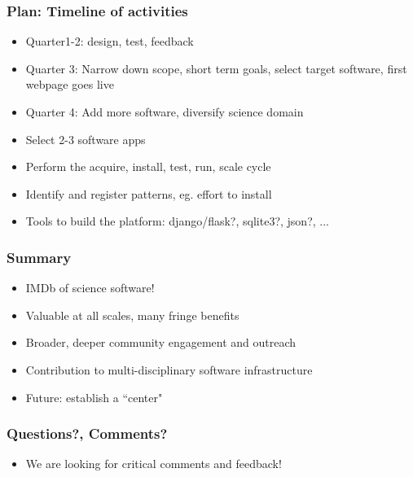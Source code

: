 \documentclass[hyperref={pdfpagelabels=false},12pt]{beamer}
\begin{document}
\begin{frame}
\frametitle{Plan: Timeline of activities }
\begin{itemize}
\itemsep1em
\item 
Quarter1-2: design, test, feedback
\item
Quarter 3: Narrow down scope, short term goals, select target software, first webpage goes live
\item
Quarter 4: Add more software, diversify science domain
\item
Select 2-3 software apps
\item
Perform the acquire, install, test, run, scale cycle
\item
Identify and register patterns, eg. effort to install
\item
Tools to build the platform: django/flask?, sqlite3?, json?, ...
\end{itemize}
\end{frame}

\begin{frame}
\frametitle{Summary}
\begin{itemize}
\itemsep1em
\item IMDb of science software!
\item
Valuable at all scales, many fringe benefits
\item
Broader, deeper community engagement and outreach
\item
Contribution to multi-disciplinary software infrastructure
\item
Future: establish a ``center"
\end{itemize}
\end{frame}

\begin{frame}
\frametitle{Questions?, Comments?}
\begin{itemize}
\item We are looking for critical comments and feedback!
\end{itemize}
\end{frame}
\end{document}
